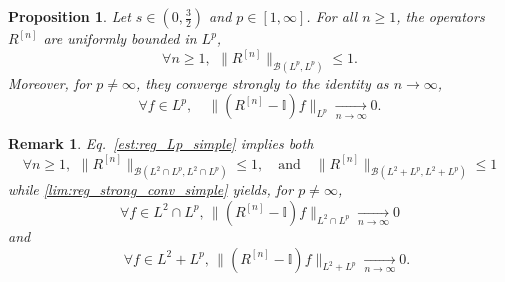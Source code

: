 \documentclass[12pt,a4paper]{amsart}
\newtheorem{prop}[theorem]{Proposition}
\newtheorem{remark}[theorem]{Remark}
\numberwithin{equation}{section}
\begin{document}
	
	\begin{prop}\label{prop:restriction-operator-on-Lp}
		Let $s\in(0,\frac32)$ and $p\in[1,\infty]$. For all $n\geq1$, the operators $R^{[n]}$ are uniformly bounded in $L^p$,
		\begin{equation}
			\label{est:reg_Lp_simple}
			\forall n \geq 1, \,\ \| R^{[n]} \|_{\mathcal{B}(L^p,L^p)} \leq 1 .
		\end{equation}
		Moreover, for $p \neq \infty$, they converge strongly to the identity as $n \rightarrow \infty $,%
		\begin{equation}
			\label{lim:reg_strong_conv_simple}
			\forall f \in L^p, \quad \| (R^{[n]} - \mathbb{I} ) f \|_{L^p} \xrightarrow[n \rightarrow \infty]{} 0 .
		\end{equation}
	\end{prop}
	\begin{remark}
		Eq.~\eqref{est:reg_Lp_simple} implies both
		\begin{equation}
			\label{est:reg_Lp}
			\forall n \geq 1, \,\ \| R^{[n]} \|_{\mathcal{B}(L^2\cap L^p,L^2\cap L^p)} \leq 1 , \quad \text{and} \quad \| R^{[n]} \|_{\mathcal{B}(L^2+ L^p,L^2+ L^p)} \leq 1
		\end{equation}
		while \eqref{lim:reg_strong_conv_simple} yields, for $p\neq \infty$,
		\begin{equation}
			\label{lim:reg_strong_conv_cap}
			\forall f \in L^2\cap L^p, \, \| (R^{[n]} - \mathbb{I} ) f \|_{L^2\cap L^p} 
			\xrightarrow[n \rightarrow \infty]{} 0
		\end{equation}
		and
		\begin{equation}
			\quad \forall  f \in L^2+ L^p, \, \| (R^{[n]} - \mathbb{I} ) f \|_{L^2+L^p} 
			\xrightarrow[n \rightarrow \infty]{} 0.\label{lim:reg_strong_conv_plus}
		\end{equation}
	\end{remark}
\end{document}

